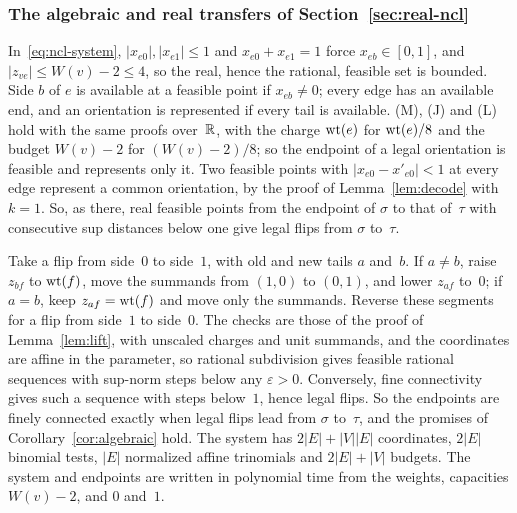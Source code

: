 \subsubsection{The algebraic and real transfers of Section~\ref{sec:real-ncl}}\label{app:ncl-algebraic}

In~\eqref{eq:ncl-system}, $|x_{e0}|,|x_{e1}|\le1$ and $x_{e0}+x_{e1}=1$
force $x_{eb}\in[0,1]$, and $|z_{ve}|\le W(v)-2\le4$, so the real, hence
the rational, feasible set is bounded. Side $b$ of $e$ is available at a
feasible point if $x_{eb}\neq0$; every edge has an available end, and an
orientation is represented if every tail is available. (M), (J) and (L)
hold with the same proofs over~$\mathbb{R}$, with the charge $\operatorname{wt}(e)$ for
$\operatorname{wt}(e)/8$ and the budget $W(v)-2$ for $(W(v)-2)/8$; so the endpoint of a
legal orientation is feasible and represents only it. Two feasible points
with $|x_{e0}-x'_{e0}|<1$ at every edge represent a common orientation, by
the proof of Lemma~\ref{lem:decode} with $k=1$. So, as there, real feasible
points from the endpoint of $\sigma$ to that of~$\tau$ with consecutive
sup distances below one give legal flips from $\sigma$ to~$\tau$.

Take a flip from side~$0$ to side~$1$, with old and new tails $a$
and~$b$. If $a\ne b$, raise $z_{bf}$ to $\operatorname{wt}(f)$, move the summands from $(1,0)$ to
$(0,1)$, and lower $z_{af}$ to~$0$; if $a=b$, keep $z_{af}=\operatorname{wt}(f)$ and move
only the summands. Reverse these segments for a flip from side~$1$ to
side~$0$. The checks are those of the proof of Lemma~\ref{lem:lift}, with
unscaled charges and unit summands, and the coordinates are affine in the
parameter, so rational subdivision gives feasible rational sequences with
sup-norm steps below any $\varepsilon>0$. Conversely, fine connectivity gives such a sequence with
steps below~$1$, hence legal flips. So the endpoints are finely connected
exactly when legal flips lead from $\sigma$ to~$\tau$, and the promises of
Corollary~\ref{cor:algebraic} hold. The system has $2|E|+|V||E|$
coordinates, $2|E|$ binomial tests, $|E|$ normalized affine trinomials and
$2|E|+|V|$ budgets. The system and endpoints are written in polynomial
time from the weights, capacities $W(v)-2$, and $0$ and~$1$.

